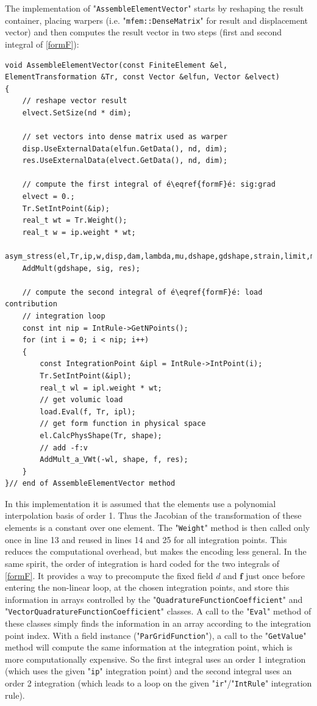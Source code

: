 \documentclass[12pt]{article}
\newcommand{\vm}[1]{
	{\ensuremath{\mathbf{#1}}}
}
\newcommand{\mycode}[1]{\textsf{"}\lstinline`#1`\textsf{"}}
\begin{document}
The implementation of \mycode{AssembleElementVector} starts by reshaping the result container, placing warpers (i.e. \mycode{mfem::DenseMatrix} for result and displacement vector)  and then computes the result vector in two steps (first and second integral of \eqref{formF}):
\begin{lstlisting}[basicstyle=\scriptsize,label=assembleElementvector]
void AssembleElementVector(const FiniteElement &el, ElementTransformation &Tr, const Vector &elfun, Vector &elvect)
{
	// reshape vector result
	elvect.SetSize(nd * dim);
	
	// set vectors into dense matrix used as warper
	disp.UseExternalData(elfun.GetData(), nd, dim);
	res.UseExternalData(elvect.GetData(), nd, dim);
	
	// compute the first integral of é\eqref{formF}é: sig:grad
	elvect = 0.;
	Tr.SetIntPoint(&ip);
	real_t wt = Tr.Weight();
	real_t w = ip.weight * wt;
	asym_stress(el,Tr,ip,w,disp,dam,lambda,mu,dshape,gdshape,strain,limit,mlimit,eval,eigns,evec,sig);
	AddMult(gdshape, sig, res);
	
	// compute the second integral of é\eqref{formF}é: load contribution
	// integration loop
	const int nip = IntRule->GetNPoints();
	for (int i = 0; i < nip; i++)
	{
		const IntegrationPoint &ipl = IntRule->IntPoint(i);
		Tr.SetIntPoint(&ipl);
		real_t wl = ipl.weight * wt;
		// get volumic load
		load.Eval(f, Tr, ipl);
		// get form function in physical space
		el.CalcPhysShape(Tr, shape);
		// add -f:v
		AddMult_a_VWt(-wl, shape, f, res);
	}
}// end of AssembleElementVector method
\end{lstlisting}
In this implementation it is assumed that the elements use a polynomial interpolation basis of order 1. 
Thus the Jacobian of the transformation of these elements is a constant over one element. The \mycode{Weight} method is then called only once in line 13 and reused in lines 14 and 25 for all integration points. This reduces the computational overhead, but makes the encoding less general.
In the same spirit, the order of integration is hard coded for the two integrals of \eqref{formF}.
It provides a way to precompute the fixed field $d$ and $\vm{f}$ just once before entering the non-linear loop, at the chosen integration points, and store this information in arrays controlled by the \mycode{QuadratureFunctionCoefficient} and \mycode{VectorQuadratureFunctionCoefficient} classes.
A call to the \mycode{Eval} method of these classes simply finds the information in an array according to the integration point index.
With a field instance (\mycode{ParGridFunction}), a call to the \mycode{GetValue} method will compute  the same information at the integration point, which is more computationally expensive.
So the first integral uses an order 1 integration (which uses the given \mycode{ip} integration point) and the second integral uses an order 2 integration (which leads to a loop on the given \mycode{ir}/\mycode{IntRule} integration rule).
\end{document}
